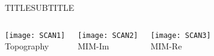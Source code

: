 \begin{frame}{TITLE}{SUBTITLE}

 \begin{columns}
   \begin{center}
  \texttt{[image: SCAN1]} \\ Topography
     \end{center}
  \begin{center}
  \texttt{[image: SCAN2]} \\ MIM-Im
   \end{center}
  \begin{center}
  \texttt{[image: SCAN3]} \\ MIM-Re
   \end{center}

  \end{columns}

\end{frame}